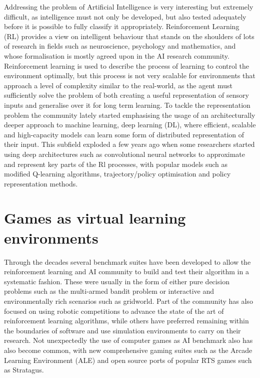 \documentclass[bsc,frontabs,twoside,singlespacing,parskip,deptreport]{infthesis}     %
\begin{document}
Addressing the problem of Artificial Intelligence is very interesting but
extremely difficult, as intelligence must not only be developed, but also tested
adequately before it is possible to fully classify it appropriately.
Reinforcement Learning (RL) provides a view on intelligent behaviour that stands
on the shoulders of lots of research in fields such as neuroscience, psychology
and mathematics, and whose formalisation is mostly agreed upon in the AI
research community\cite{Sutton:1998:IRL:551283}. Reinforcement learning is used
to describe the process of learning to control the environment optimally, but
this process is not very scalable for environments that approach a level of
complexity similar to the real-world, as the agent must sufficiently solve the
problem of both creating a useful representation of sensory inputs and
generalise over it for long term learning. To tackle the representation problem
the community lately started emphasising the usage of an architecturally deeper
approach to machine learning, deep learning (DL), where efficient, scalable and
high-capacity models can learn some form of distributed representation of their
input\cite{lecun2015deep}. This subfield exploded a few years ago when some
researchers started using deep architectures such as convolutional neural
networks to approximate and represent key parts of the Rl processes, with
popular models such as modified Q-learning algorithms\cite{mnih2013playing},
trajectory/policy optimisation\cite{levine2015end} and policy representation
methods\cite{kakade2002approximately}.

\section{Games as virtual learning environments}

Through the decades several benchmark suites have been developed to allow the
reinforcement learning and AI community to build and test their algorithm in a
systematic fashion. These were usually in the form of either pure decision
problems such as the multi-armed bandit problem\cite{berry1985bandit} or
interactive and environmentally rich scenarios such as gridworld. Part of the
community has also focused on using robotic competitions to advance the state of
the art of reinforcement learning algorithms\cite{stone2001scaling}, while
others have preferred remaining within the boundaries of software and use
simulation environments to carry on their research\cite{gosavi2014simulation}.
Not unexpectedly the use of computer games as AI benchmark also has also become
common, with new comprehensive gaming suites such as the Arcade Learning
Environment (ALE)\cite{bellemare2012arcade} and open source ports of popular
RTS games such as Stratagus\cite{ponsen2005stratagus}.
\end{document}
